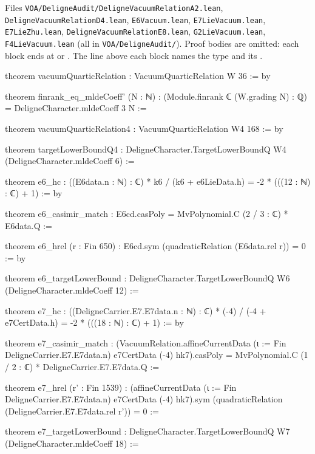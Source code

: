 \documentclass[11pt,openany]{book}
\newcommand{\lean}[1]{\texttt{\detokenize{#1}}}
\newcommand{\leanpath}[1]{\texttt{\small #1}}
\theoremstyle{definition}
\theoremstyle{plain}
\begin{document}
{\raggedright\noindent Files \leanpath{VOA/\allowbreak DeligneAudit/\allowbreak DeligneVacuumRelationA2.lean},
\leanpath{DeligneVacuumRelationD4.lean}, \leanpath{E6Vacuum.lean}, \leanpath{E7LieVacuum.lean}, \leanpath{E7LieZhu.lean},
\leanpath{DeligneVacuumRelationE8.lean}, \leanpath{G2LieVacuum.lean}, \leanpath{F4LieVacuum.lean} (all in
\leanpath{VOA/\allowbreak DeligneAudit/\allowbreak }). Proof bodies are omitted: each block ends at \lean{:=} or \lean{:= by}. The
line above each block names the type and its \lean{W}.\par}
\begin{leancode}
theorem vacuumQuarticRelation : VacuumQuarticRelation W 36 := by

theorem finrank_eq_mldeCoeff' (N : ℕ) :
    (Module.finrank ℂ (W.grading N) : ℚ) = DeligneCharacter.mldeCoeff 3 N :=
\end{leancode}
\begin{leancode}
theorem vacuumQuarticRelation4 : VacuumQuarticRelation W4 168 := by

theorem targetLowerBoundQ4 : DeligneCharacter.TargetLowerBoundQ W4 (DeligneCharacter.mldeCoeff 6) :=
\end{leancode}
\begin{leancode}
theorem e6_hc : ((E6data.n : ℕ) : ℂ) * k6 / (k6 + e6LieData.h) = -2 * (((12 : ℕ) : ℂ) + 1) := by

theorem e6_casimir_match : E6cd.casPoly = MvPolynomial.C (2 / 3 : ℂ) * E6data.Q :=

theorem e6_hrel (r : Fin 650) : E6cd.sym (quadraticRelation (E6data.rel r)) = 0 := by

theorem e6_targetLowerBound : DeligneCharacter.TargetLowerBoundQ W6 (DeligneCharacter.mldeCoeff 12) :=
\end{leancode}
\begin{leancode}
theorem e7_hc : ((DeligneCarrier.E7.E7data.n : ℕ) : ℂ) * (-4) / (-4 + e7CertData.h) =
    -2 * (((18 : ℕ) : ℂ) + 1) := by

theorem e7_casimir_match :
    (VacuumRelation.affineCurrentData (ι := Fin DeligneCarrier.E7.E7data.n) e7CertData (-4)
      hk7).casPoly = MvPolynomial.C (1 / 2 : ℂ) * DeligneCarrier.E7.E7data.Q :=

theorem e7_hrel (r' : Fin 1539) :
    (affineCurrentData (ι := Fin DeligneCarrier.E7.E7data.n) e7CertData (-4) hk7).sym
      (quadraticRelation (DeligneCarrier.E7.E7data.rel r')) = 0 :=

theorem e7_targetLowerBound : DeligneCharacter.TargetLowerBoundQ W7 (DeligneCharacter.mldeCoeff 18) :=
\end{leancode}
\end{document}
